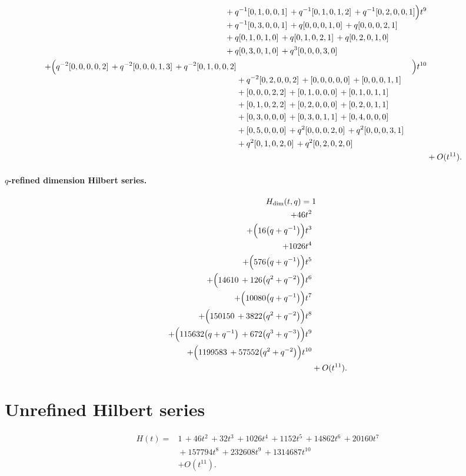 \documentclass[10pt]{article}
\begin{document}
\[\begin{aligned}
\begin{aligned}[t]
  &{}+q^{-1}[0,1,0,0,1]\,+q^{-1}[0,1,0,1,2]\,+q^{-1}[0,2,0,0,1] \\
  &{}+q^{-1}[0,3,0,0,1]\,+q[0,0,0,1,0]\,+q[0,0,0,2,1] \\
  &{}+q[0,1,0,1,0]\,+q[0,1,0,2,1]\,+q[0,2,0,1,0] \\
  &{}+q[0,3,0,1,0]\,+q^{3}[0,0,0,3,0]\end{aligned}\Bigr)t^{9} \\
  + \Bigl(\begin{aligned}[t]q^{-2}[0,0,0,0,2]\,+q^{-2}[0,0,0,1,3]\,+q^{-2}[0,1,0,0,2] \\
  &{}+q^{-2}[0,2,0,0,2]\,+[0,0,0,0,0]\,+[0,0,0,1,1] \\
  &{}+[0,0,0,2,2]\,+[0,1,0,0,0]\,+[0,1,0,1,1] \\
  &{}+[0,1,0,2,2]\,+[0,2,0,0,0]\,+[0,2,0,1,1] \\
  &{}+[0,3,0,0,0]\,+[0,3,0,1,1]\,+[0,4,0,0,0] \\
  &{}+[0,5,0,0,0]\,+q^{2}[0,0,0,2,0]\,+q^{2}[0,0,0,3,1] \\
  &{}+q^{2}[0,1,0,2,0]\,+q^{2}[0,2,0,2,0]\end{aligned}\Bigr)t^{10} \\
  &+ O(t^{11}).
\end{aligned}
\]
\paragraph{$q$-refined dimension Hilbert series.}
\[
\begin{aligned}
H_{\mathrm{dim}}(t,q) ={}&
   1 \\
  + 46t^{2} \\
  + \Bigl(16\bigl(q+q^{-1}\bigr)\Bigr)t^{3} \\
  + 1026t^{4} \\
  + \Bigl(576\bigl(q+q^{-1}\bigr)\Bigr)t^{5} \\
  + \Bigl(14610\,+126\bigl(q^{2}+q^{-2}\bigr)\Bigr)t^{6} \\
  + \Bigl(10080\bigl(q+q^{-1}\bigr)\Bigr)t^{7} \\
  + \Bigl(150150\,+3822\bigl(q^{2}+q^{-2}\bigr)\Bigr)t^{8} \\
  + \Bigl(115632\bigl(q+q^{-1}\bigr)\,+672\bigl(q^{3}+q^{-3}\bigr)\Bigr)t^{9} \\
  + \Bigl(1199583\,+57552\bigl(q^{2}+q^{-2}\bigr)\Bigr)t^{10} \\
  &+ O(t^{11}).
\end{aligned}
\]

\section{Unrefined Hilbert series}
\[
\begin{aligned}
H(t) ={}& 1\,+46t^{2}\,+32t^{3}\,+1026t^{4}\,+1152t^{5}\,+14862t^{6}\,+20160t^{7} \\
  &{}+157794t^{8}\,+232608t^{9}\,+1314687t^{10} \\
  &+ O(t^{11}).
\end{aligned}
\]
\end{document}
